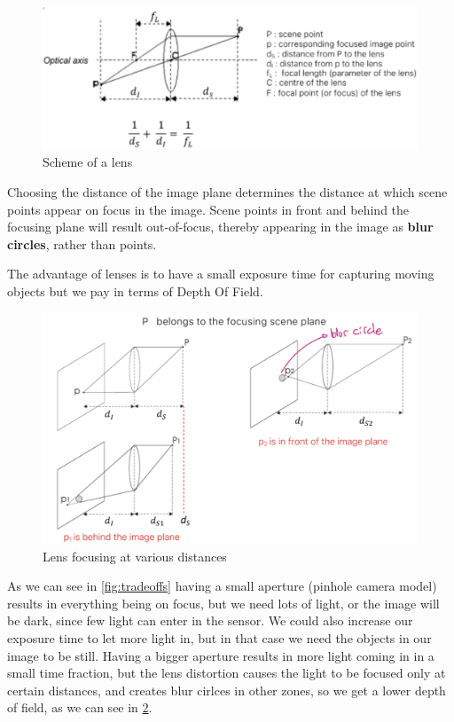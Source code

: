 \documentclass{article}
\begin{document}
\begin{figure}[htbp]
  \centering
  \includegraphics[width=0.7\linewidth]{./img/lens.jpg}
  \caption{Scheme of a lens}
  \label{fig:lens}
\end{figure}

Choosing the distance of the image plane determines the distance at which scene points appear on focus in the image.
Scene points in front and behind the focusing plane will result out-of-focus, thereby appearing in the image as \textbf{blur circles}, rather than points.

The advantage of lenses is to have a small exposure time for capturing moving objects but we pay in terms of Depth Of Field.

\begin{figure}[htbp]
  \centering
  \includegraphics[width=0.8\linewidth]{./img/lens_focus.jpg}
  \caption{Lens focusing at various distances}
  \label{fig:lens_focus}
\end{figure}

As we can see in \ref{fig:tradeoffs} having a small aperture (pinhole camera model) results in everything being on focus, but we need lots of light, or the image will be dark, since few light can enter in the sensor.
We could also increase our exposure time to let more light in, but in that case we need the objects in our image to be still.
Having a bigger aperture results in more light coming in in a small time fraction, but the lens distortion causes the light to be focused only at certain distances, and creates blur cirlces in other zones, so we get a lower depth of field, as we can see in \ref{fig:lens_focus}.
\end{document}
